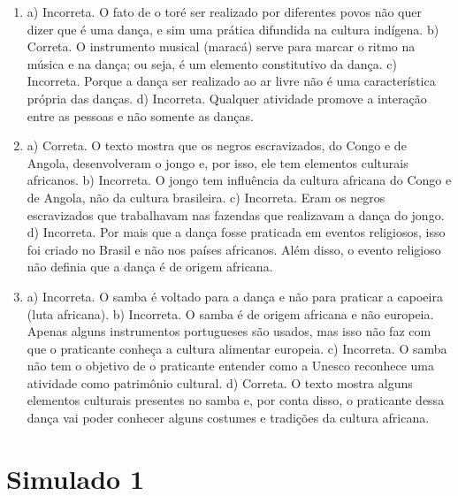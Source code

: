 \begin{enumerate}

\item
a) Incorreta. O fato de o toré ser realizado por diferentes povos não quer
dizer que é uma dança, e sim uma prática difundida na cultura indígena.
b) Correta. O instrumento musical (maracá) serve para marcar o ritmo na música e na dança; ou seja, é um elemento constitutivo da dança.
c) Incorreta. Porque a dança ser realizado ao ar livre não é uma
característica própria das danças.
d) Incorreta. Qualquer atividade promove a interação entre as
pessoas e não somente as danças.

\item
a) Correta. O texto mostra que os negros escravizados, do Congo e
de Angola, desenvolveram o jongo e, por isso, ele tem elementos
culturais africanos.
b) Incorreta. O jongo tem influência da cultura africana do Congo
e de Angola, não da cultura brasileira.
c) Incorreta. Eram os negros escravizados que trabalhavam nas
fazendas que realizavam a dança do jongo.
d) Incorreta. Por mais que a dança fosse praticada em eventos religiosos,
isso foi criado no Brasil e não nos países africanos. Além disso, o
evento religioso não definia que a dança é de origem africana.

\item
a) Incorreta. O samba é voltado para a dança e não para praticar a capoeira (luta africana).
b) Incorreta. O samba é de origem africana e não europeia. Apenas
alguns instrumentos portugueses são usados, mas isso não faz com que o
praticante conheça a cultura alimentar europeia.
c) Incorreta. O samba não tem o objetivo de o praticante entender
como a Unesco reconhece uma atividade como patrimônio cultural.
d) Correta. O texto mostra alguns elementos culturais presentes
no samba e, por conta disso, o praticante dessa dança vai poder conhecer
alguns costumes e tradições da cultura africana.
\end{enumerate}


\chapter{Simulado 1}

